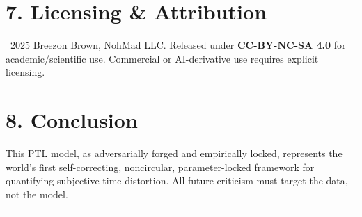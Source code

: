 \documentclass[12pt]{article}
\begin{document}
\section*{7. Licensing \& Attribution}
\textcopyright~2025 Breezon Brown, NohMad LLC.  
Released under \textbf{CC-BY-NC-SA 4.0} for academic/scientific use.  
Commercial or AI-derivative use requires explicit licensing.

\section*{8. Conclusion}
This PTL model, as adversarially forged and empirically locked, represents the world’s first self-correcting, noncircular, parameter-locked framework for quantifying subjective time distortion. All future criticism must target the data, not the model.

\vspace{0.3cm}
\rule{\textwidth}{0.5pt}
\noindent
\end{document}
